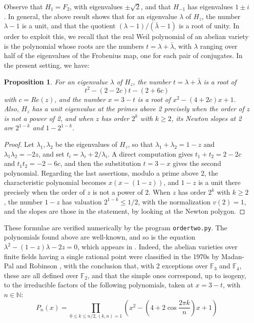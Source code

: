 \documentclass[11pt]{amsart}
\newtheorem{proposition}[theorem]{Proposition}
\theoremstyle{definition}
\begin{document}
Observe that $H_1=F_2$, with eigenvalues $\pm\sqrt{2}$, and that $H_{-1}$ has eigenvalues $1\pm i$. In general, the above result shows that for an eigenvalue $\lambda$ of $H_z$, the number $\lambda-1$ is a unit, and that the quotient $(\lambda-1)/(\bar{\lambda}-1)$ is a root of unity. In order to exploit this, we recall that the real Weil polynomial of an abelian variety is the polynomial whose roots are the numbers $t=\lambda+\bar{\lambda}$, with $\lambda$ ranging over half of the eigenvalues of the Frobenius map, one for each pair of conjugates. In the present setting, we have:

\begin{proposition}\label{preal}
For an eigenvalue $\lambda$ of $H_z$, the number $t=\lambda+\bar{\lambda}$ is a root of
$$t^2-(2-2c)t-(2+6c)$$
with $c=Re(z)$, and the number $x=3-t$ is a root of $x^2-(4+2c)x+1$. Also, $H_z$ has a unit eigenvalue at the primes above 2 precisely when the order of $z$ is not a power of 2, and when $z$ has order $2^k$ with $k\geq2$, its Newton slopes at 2 are $2^{1-k}$ and $1-2^{1-k}$.
\end{proposition}

\begin{proof}
Let $\lambda_1,\lambda_2$ be the eigenvalues of $H_z$, so that $\lambda_1+\lambda_2=1-z$ and $\lambda_1\lambda_2=-2z$, and set $t_i=\lambda_i+2/\lambda_i$. A direct computation gives $t_1+t_2=2-2c$ and $t_1t_2=-2-6c$, and then the substitution $t=3-x$ gives the second polynomial. Regarding the last assertions, modulo a prime above 2, the characteristic polynomial becomes $x(x-(1-z))$, and $1-z$ is a unit there precisely when the order of $z$ is not a power of 2. When $z$ has order $2^k$ with $k\geq2$, the number $1-z$ has valuation $2^{1-k}\leq1/2$, with the normalization $v(2)=1$, and the slopes are those in the statement, by looking at the Newton polygon.
\end{proof}

These formulae are verified numerically by the program \texttt{ordertwo.py}. The polynomials found above are well-known, and so is the equation $\lambda^2-(1-z)\lambda-2z=0$, which appears in \cite{dke}. Indeed, the abelian varieties over finite fields having a single rational point were classified in the 1970s by Madan-Pal \cite{mpa} and Robinson \cite{rob}, with the conclusion that, with 2 exceptions over $\mathbb F_3$ and $\mathbb F_4$, these are all defined over $\mathbb F_2$, and that the simple ones correspond, up to isogeny, to the irreducible factors of the following polynomials, taken at $x=3-t$, with $n\in\mathbb N$:
$$P_n(x)=\prod_{0\leq k\leq n/2,(k,n)=1}\left(x^2-\left(4+2\cos\frac{2\pi k}{n}\right)x+1\right)$$
\end{document}
